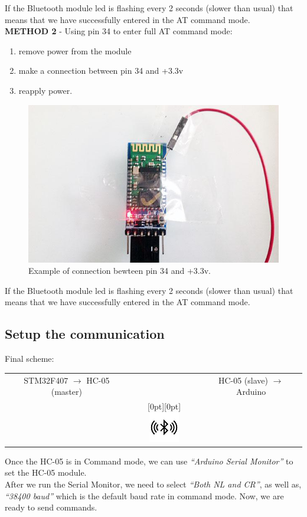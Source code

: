 If the Bluetooth module led is flashing every 2 seconds (slower than usual) that means that we have successfully entered in the AT command mode.\\
\textbf{METHOD 2} - Using pin 34 to enter full AT command mode:
\begin{enumerate}
	\item remove power from the module
	\item make a connection between pin 34 and +3.3v
	\item reapply power.
\end{enumerate}
\begin{figure}[H]
	\centering
	\includegraphics[width=\textwidth]
	{files/images/hc05_pin34}
	\caption{Example of connection bewteen pin 34 and +3.3v.}
\end{figure}
If the Bluetooth module led is flashing every 2 seconds (slower than usual) that means that we have successfully entered in the AT command mode.\\

\subsection{Setup the communication}
Final scheme:\\

\begin{tabular}{c c c}
STM32F407  $\rightarrow$ HC-05 (master)&  & HC-05 (slave) $\rightarrow$ Arduino \\
 & \raisebox{0pt}[0pt][0pt]{
	\includegraphics{files/images/bluetooth_logo_resize} }
 & \\
\end{tabular}
Once the HC-05 is in Command mode, we can use \textit{“Arduino Serial Monitor”} to set the HC-05 module.\\
After we run the Serial Monitor, we need to select \textit{“Both NL and CR”}, as well as, \textit{“38400 baud”} which is the default baud rate in command mode. Now, we are ready to send commands.\\

